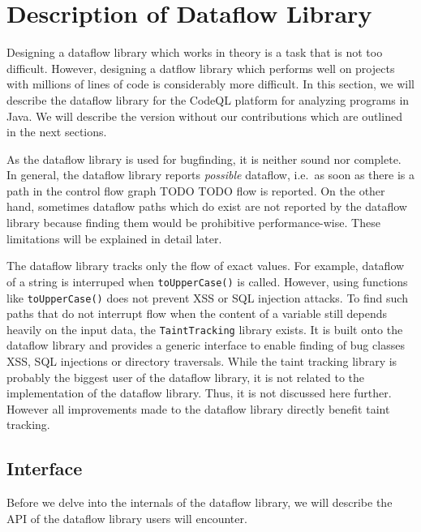 \newpage
\section{Description of Dataflow Library}
Designing a dataflow library which works in theory is a task that is not too difficult.
However, designing a datflow library which performs well on projects with millions of lines of code is 
considerably more difficult.
In this section, we will describe the dataflow library for the CodeQL platform %
for analyzing programs in Java.
We will describe the version without our contributions which are outlined in the next sections.

As the dataflow library is used for bugfinding, it is neither sound nor complete.
In general, the dataflow library reports \emph{possible} dataflow, i.e.\ as soon
as there is a path in the control flow graph TODO TODO flow is reported.
On the other hand, sometimes dataflow paths which do exist are not reported by the 
dataflow library because finding them would be prohibitive performance-wise.
These limitations will be explained in detail later. 

The dataflow library tracks only the flow of exact values.
For example, dataflow of a string is interruped when \texttt{toUpperCase()} is called.
However, using functions like \texttt{toUpperCase()} does not prevent XSS or SQL injection attacks.
To find such paths that do not interrupt flow when the content of a variable still depends 
heavily on the input data, the \texttt{TaintTracking} library exists.
It is built onto the dataflow library and provides a generic interface to enable
finding of bug classes XSS, SQL injections or directory traversals.
While the taint tracking library is probably the biggest user of the dataflow library,
it is not related to the implementation of the dataflow library.
Thus, it is not discussed here further.
However all improvements made to the dataflow library directly benefit taint tracking.

\subsection{Interface}
Before we delve into the internals of the dataflow library, we will describe the API 
of the dataflow library users will encounter. %

